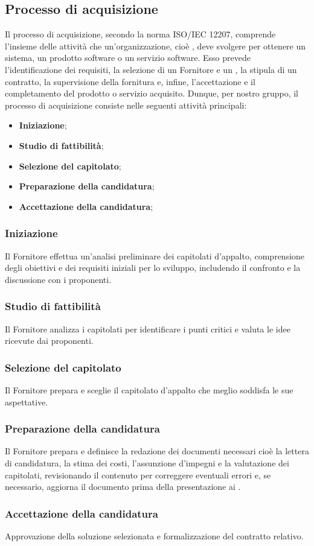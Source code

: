 \subsection{Processo di acquisizione}
\label{subsection:Processo_acquisizione}
Il processo di acquisizione, secondo la norma ISO/IEC 12207, comprende l'insieme delle attività che un'organizzazione, cioè , deve svolgere per ottenere un sistema, un prodotto software o un servizio software. Esso prevede l'identificazione dei requisiti, la selezione di un Fornitore e un , la stipula di un contratto, la supervisione della fornitura e, infine, l'accettazione e il completamento del prodotto o servizio acquisito.
Dunque, per nostro gruppo, il processo di acquisizione consiste nelle seguenti attività principali:

\begin{itemize}
    \item \textbf{Iniziazione}; 
    \item \textbf{Studio di fattibilità}; 
    \item \textbf{Selezione del capitolato}; 
    \item \textbf{Preparazione della candidatura}; 
    \item \textbf{Accettazione della candidatura}; 
\end{itemize}

\subsubsection{Iniziazione}
Il Fornitore effettua un'analisi preliminare dei capitolati d’appalto, comprensione degli obiettivi e dei requisiti iniziali per lo sviluppo, includendo il confronto e la discussione con i proponenti.

\subsubsection{Studio di fattibilità}
Il Fornitore analizza i capitolati per identificare i punti critici e valuta le idee ricevute dai proponenti.

\subsubsection{Selezione del capitolato}
Il Fornitore prepara e sceglie il capitolato d'appalto che meglio soddisfa le sue aspettative.

\subsubsection{Preparazione della candidatura}
Il Fornitore prepara e definisce la redazione dei documenti necessari cioè la lettera di candidatura, la stima dei costi, l'assunzione d’impegni e la valutazione dei capitolati, revisionando il contenuto per correggere eventuali errori e, se necessario, aggiorna il documento prima della presentazione ai .

\subsubsection{Accettazione della candidatura}
Approvazione della soluzione selezionata e formalizzazione del contratto relativo.